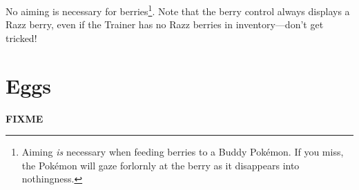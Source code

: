 No aiming is necessary for berries\footnote{Aiming \textit{is} necessary when feeding berries to a Buddy Pokémon.
If you miss, the Pokémon will gaze forlornly at the berry as it disappears into nothingness.}.
Note that the berry control always displays a Razz berry, even if the Trainer
  has no Razz berries in inventory---don't get tricked!

\section{Eggs}
\label{sec:eggs}
\textbf{FIXME}


